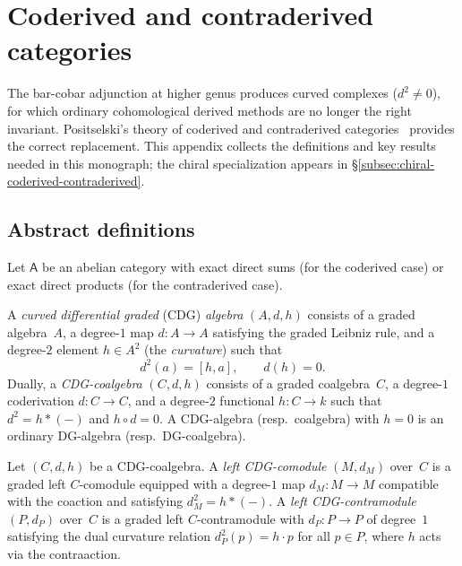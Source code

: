 
\section{Coderived and contraderived categories}
\label{app:coderived}

The bar-cobar adjunction at higher genus produces curved complexes
($d^2 \neq 0$), for which ordinary cohomological derived methods
are no longer the right invariant.
Positselski's theory of coderived and contraderived
categories~\cite{Positselski11} provides the correct
replacement.  This appendix collects the definitions and key results
needed in this monograph; the chiral specialization appears in
\S\ref{subsec:chiral-coderived-contraderived}.

\subsection{Abstract definitions}
\label{subsec:coderived-abstract}

Let $\mathsf{A}$ be an abelian category with exact direct sums
(for the coderived case) or exact direct products
(for the contraderived case).

\begin{definition}
\label{def:cdg-algebra-appendix}
A \emph{curved differential graded} (CDG) \emph{algebra}
$(A, d, h)$ consists of a graded algebra~$A$, a degree-$1$
map $d \colon A \to A$ satisfying the graded Leibniz rule, and
a degree-$2$ element $h \in A^2$ (the \emph{curvature}) such that
\begin{equation}\label{eq:cdg-relations-appendix}
d^2(a) = [h, a], \qquad d(h) = 0.
\end{equation}
Dually, a \emph{CDG-coalgebra} $(C, d, h)$ consists of a graded
coalgebra~$C$, a degree-$1$ coderivation $d \colon C \to C$,
and a degree-$2$ functional $h \colon C \to k$ such that
$d^2 = h \ast (-)$ and $h \circ d = 0$.
A CDG-algebra (resp.\ coalgebra) with $h = 0$ is an ordinary
DG-algebra (resp.\ DG-coalgebra).
\end{definition}

\begin{definition}
\label{def:cdg-comod-contra-appendix}
Let $(C, d, h)$ be a CDG-coalgebra.
A \emph{left CDG-comodule} $(M, d_M)$ over~$C$ is a graded left
$C$-comodule equipped with a degree-$1$ map $d_M \colon M \to M$
compatible with the coaction and satisfying $d_M^2 = h \ast (-)$.
A \emph{left CDG-contramodule} $(P, d_P)$ over~$C$ is a graded left
$C$-contramodule with $d_P \colon P \to P$ of degree~$1$ satisfying
the dual curvature relation $d_P^2(p) = h \cdot p$
for all $p \in P$, where $h$ acts via the contraaction.
\end{definition}

